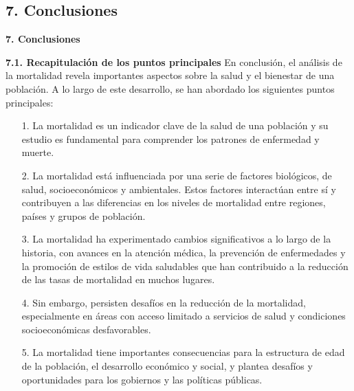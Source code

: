 \documentclass[8pt,a4paper]{beamer}
\begin{document}
{\subsection{7. Conclusiones}
\begin{frame}{\textbf{7. Conclusiones}}
\begin{block}{\textbf{7.1. Recapitulación de los puntos principales}}
\setlength{\parskip}{3px}
\justifying
En conclusión, el análisis de la mortalidad revela importantes aspectos sobre la salud y el bienestar de una población. A lo largo de este desarrollo, se han abordado los siguientes puntos principales:
\begin{enumerate}
\setlength{\parskip}{3px}
\justifying
\item[1.] La mortalidad es un indicador clave de la salud de una población y su estudio es fundamental para comprender los patrones de enfermedad y muerte.

\item[2.] La mortalidad está influenciada por una serie de factores biológicos, de salud, socioeconómicos y ambientales. Estos factores interactúan entre sí y contribuyen a las diferencias en los niveles de mortalidad entre regiones, países y grupos de población.

\item[3.] La mortalidad ha experimentado cambios significativos a lo largo de la historia, con avances en la atención médica, la prevención de enfermedades y la promoción de estilos de vida saludables que han contribuido a la reducción de las tasas de mortalidad en muchos lugares.

\end{enumerate}
\end{block}
\end{frame}

\begin{frame}{}
\begin{block}{}
\setlength{\parskip}{3px}
\justifying
\begin{enumerate}
\setlength{\parskip}{3px}
\justifying
\item[4.] Sin embargo, persisten desafíos en la reducción de la mortalidad, especialmente en áreas con acceso limitado a servicios de salud y condiciones socioeconómicas desfavorables.

\item[5.] La mortalidad tiene importantes consecuencias para la estructura de edad de la población, el desarrollo económico y social, y plantea desafíos y oportunidades para los gobiernos y las políticas públicas.


\end{enumerate}
\end{block}
\end{frame}}
\end{document}
